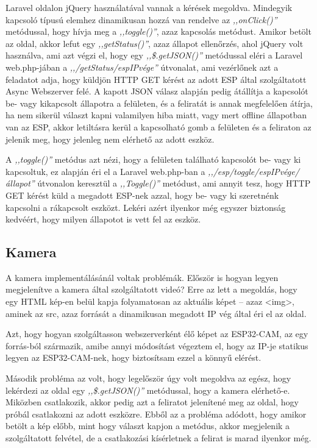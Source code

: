 \documentclass[
]{thesis-ekf}
\theoremstyle{definition}
\theoremstyle{remark}
\begin{document}
	Laravel oldalon jQuery használatával vannak a kérések megoldva. Mindegyik kapcsoló típusú elemhez dinamikusan hozzá van rendelve az \emph{,,onClick()''} metódussal, hogy hívja meg a \emph{,,toggle()''}, azaz kapcsolás metódust. Amikor betölt az oldal, akkor lefut egy \emph{,,getStatus()''}, azaz állapot ellenőrzés, ahol jQuery volt használva, ami azt végzi el, hogy egy \emph{,,\$.getJSON()''} metódussal eléri a Laravel web.php-jában a \emph{,,/getStatus/espIPvége''} útvonalat, ami vezérlőnek azt a feladatot adja, hogy küldjön HTTP GET kérést az adott ESP által szolgáltatott Async Webszerver felé. A kapott JSON válasz alapján pedig átállítja a kapcsolót be- vagy kikapcsolt állapotra a felületen, és a feliratát is annak megfelelően átírja, ha nem sikerül választ kapni valamilyen hiba miatt, vagy mert offline állapotban van az ESP, akkor letiltásra kerül a kapcsolható gomb a felületen és a feliraton az jelenik meg, hogy jelenleg nem elérhető az adott eszköz.
	
	A \emph{,,toggle()''} metódus azt nézi, hogy a felületen található kapcsolót be- vagy ki kapcsoltuk, ez alapján éri el a Laravel web.php-ban a \emph{,,/esp/toggle/espIPvége/állapot''} útvonalon keresztül a \emph{,,Toggle()''} metódust, ami annyit tesz, hogy HTTP GET kérést küld a megadott ESP-nek azzal, hogy be- vagy ki szeretnénk kapcsolni a rákapcsolt eszközt. Lekéri azért ilyenkor még egyszer biztonság kedvéért, hogy milyen állapotot is vett fel az eszköz.
	
	\subsection{Kamera}
	
	A kamera implementálásánál voltak problémák. Először is hogyan legyen megjelenítve a kamera által szolgáltatott videó? Erre az lett a megoldás, hogy egy HTML kép-en belül kapja folyamatosan az aktuális képet -- azaz <img>, aminek az src, azaz forrását a dinamikusan megadott IP vég által éri el az oldal.
	
	Azt, hogy hogyan szolgáltasson webszerverként élő képet az ESP32-CAM, az egy forrás-ból\cite{esp32-cam} származik, amibe annyi módosítást végeztem el, hogy az IP-je statikus legyen az ESP32-CAM-nek, hogy biztosítsam ezzel a könnyű elérést. 
	
	Második probléma az volt, hogy legelőször úgy volt megoldva az egész, hogy lekérdezi az oldal egy \emph{,,\$.getJSON()''} metódussal, hogy a kamera elérhető-e. Miközben csatlakozik, akkor pedig azt a feliratot jelenítené meg az oldal, hogy próbál csatlakozni az adott eszközre. Ebből az a probléma adódott, hogy amikor betölt a kép előbb, mint hogy választ kapjon a metódus, akkor megjelenik a szolgáltatott felvétel, de a csatlakozási kísérletnek a felirat is marad ilyenkor még.
	
\end{document}
